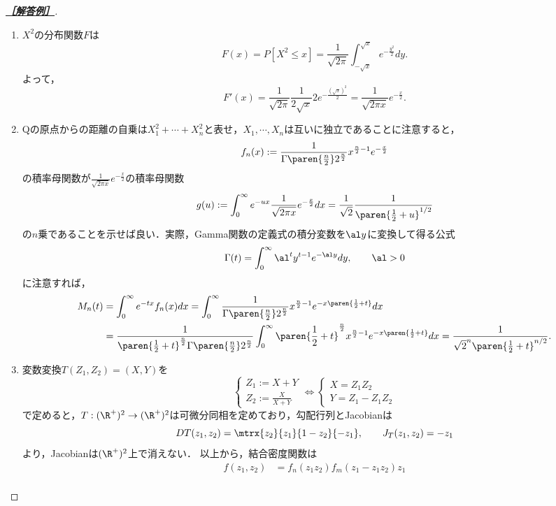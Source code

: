 \documentclass[uplatex,dvipdfmx]{jsarticle}
\begin{document}
\begin{proof}[\textbf{\underline{［解答例］}}]\mbox{}
    \begin{enumerate}
        \item $X^2$の分布関数$F$は
        \[F(x)=P[X^2\le x]=\frac{1}{\sqrt{2\pi}}\int^{\sqrt{x}}_{-\sqrt{x}}e^{-\frac{y^2}{2}}dy.\]
        よって，
        \[F'(x)=\frac{1}{\sqrt{2\pi}}\frac{1}{2\sqrt{x}}2e^{-\frac{(\sqrt{x})^2}{2}}=\frac{1}{\sqrt{2\pi x}}e^{-\frac{x}{2}}.\]
        \item Qの原点からの距離の自乗は$X_1^2+\cdots+X_n^2$と表せ，$X_1,\cdots,X_n$は互いに独立であることに注意すると，
        \[f_n(x):=\frac{1}{\Gamma\paren{\frac{n}{2}}2^{\frac{n}{2}}}x^{\frac{n}{2}-1}e^{-\frac{x}{2}}\]
        の積率母関数が$\frac{1}{\sqrt{2\pi x}}e^{-\frac{x}{2}}$の積率母関数
        \[g(u):=\int^\infty_0e^{-ux}\frac{1}{\sqrt{2\pi x}}e^{-\frac{x}{2}}dx=\frac{1}{\sqrt{2}}\frac{1}{\paren{\frac{1}{2}+u}^{1/2}}\]
        の$n$乗であることを示せば良い．実際，Gamma関数の定義式の積分変数を$\al y$に変換して得る公式
        \[\Gamma(t)=\int^\infty_0\al^ty^{t-1}e^{-\al y}dy,\qquad\al>0\]
        に注意すれば，
        \begin{align*}
            M_n(t)&=\int^\infty_0e^{-tx}f_n(x)dx=\int^\infty_0\frac{1}{\Gamma\paren{\frac{n}{2}}2^{\frac{n}{2}}}x^{\frac{n}{2}-1}e^{-x\paren{\frac{1}{2}+t}}dx\\
            &=\frac{1}{\paren{\frac{1}{2}+t}^{\frac{n}{2}}\Gamma\paren{\frac{n}{2}}2^{\frac{n}{2}}}\int^\infty_0\paren{\frac{1}{2}+t}^{\frac{n}{2}}x^{\frac{n}{2}-1}e^{-x\paren{\frac{1}{2}+t}}dx=\frac{1}{\sqrt{2}^n\paren{\frac{1}{2}+t}^{n/2}}.
        \end{align*}
        \item 変数変換$T(Z_1,Z_2)=(X,Y)$を
        \[\begin{cases}
            Z_1:=X+Y\\
            Z_2:=\frac{X}{X+Y}
        \end{cases}\Leftrightarrow\begin{cases}
            X=Z_1Z_2\\
            Y=Z_1-Z_1Z_2
        \end{cases}\]
        で定めると，$T:(\R^+)^2\to(\R^+)^2$は可微分同相を定めており，勾配行列とJacobianは
        \[DT(z_1,z_2)=\mtrx{z_2}{z_1}{1-z_2}{-z_1},\qquad J_T(z_1,z_2)=-z_1\]
        より，Jacobianは$(\R^+)^2$上で消えない．
        以上から，結合密度関数は
        \begin{align*}
            f(z_1,z_2)&=f_n(z_1z_2)f_m(z_1-z_1z_2)z_1\\

\end{align*}
\end{enumerate}
\end{proof}
\end{document}
